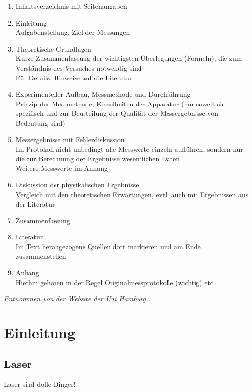 \documentclass[10pt,a4paper]{article}
\begin{document}
\begin{enumerate}

    \item{Inhaltsverzeichnis mit Seitenangaben}
    \item{Einleitung}\\
    Aufgabenstellung, Ziel der Messungen
    \item{Theoretische Grundlagen}\\
    Kurze Zusammenfassung der wichtigsten Überlegungen (Formeln), die zum Verständnis des Versuches notwendig sind\\
    Für Details: Hinweise auf die Literatur
    \item{Experimenteller Aufbau, Messmethode und Durchführung}\\
    Prinzip der Messmethode, Einzelheiten der Apparatur (nur soweit sie spezifisch und zur Beurteilung der Qualität der Messergebnisse von Bedeutung sind)
    \item{Messergebnisse mit Fehlerdiskussion}\\
    Im Protokoll nicht unbedingt alle Messwerte einzeln aufführen, sondern nur die zur Berechnung der Ergebnisse wesentlichen Daten\\
    Weitere Messwerte im Anhang
    \item{Diskussion der physikalischen Ergebnisse}\\
    Vergleich mit den theoretischen Erwartungen, evtl. auch mit Ergebnissen aus der Literatur
    \item{Zusammenfassung}
    \item{Literatur}\\
    Im Text herangezogene Quellen dort markieren und am Ende zusammenstellen
   \item{Anhang}\\
    Hierhin gehören in der Regel Originalmessprotokolle (wichtig) etc. 
    
\end{enumerate}

\textit{Entnommen von der Website der Uni Hamburg \cite{hinweise}.}

\section{Einleitung}
\subsection{Laser} Laser sind dolle Dinger!
\end{document}

